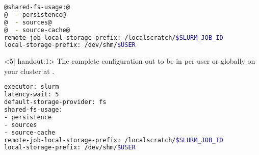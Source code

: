 \begin{frame}[fragile]
\begin{onlyenv}
\begin{lstlisting}[language=Bash, style=Shell]
@shared-fs-usage:@
@  - persistence@
@  - sources@
@  - source-cache@
remote-job-local-storage-prefix: /localscratch/$SLURM_JOB_ID 
local-storage-prefix: /dev/shm/$USER 
     \end{lstlisting}
  \end{onlyenv}
   \begin{onlyenv}<5| handout:1>
   	The complete configuration out to be in  per user or globally on your cluster at .
   	\begin{lstlisting}[language=Bash, style=Shell]
executor: slurm
latency-wait: 5
default-storage-provider: fs
shared-fs-usage:
- persistence
- sources
- source-cache
remote-job-local-storage-prefix: /localscratch/$SLURM_JOB_ID
local-storage-prefix: /dev/shm/$USER
    \end{lstlisting}
  \end{onlyenv}
\end{frame}

